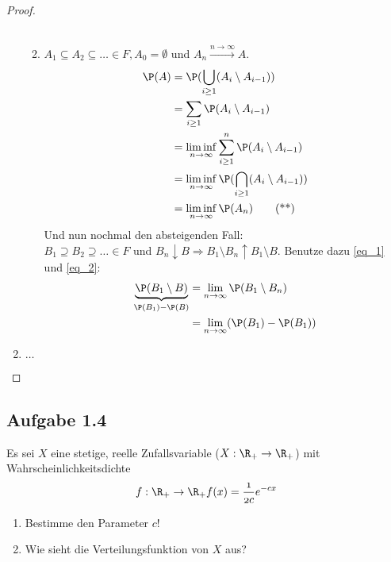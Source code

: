 \begin{proof}
\begin{enumerate}
\begin{enumerate}
\begin{align}
			\end{align}
			\item $A_1 \subseteq A_2 \subseteq \dots \in F, A_0 = \emptyset$ und $A_n \xrightarrow{n \to \infty} A$. 
			\begin{align}
				\P(A) 
				&= \P(\bigcup_{i \ge 1} (A_i \setminus A_{i-1})) \notag\\
				&= \sum_{i\ge 1} \P(A_i \setminus A_{i-1})\notag\\
				&= \liminf_{n \to \infty} \sum_{i\ge 1}^{n} \P(A_i \setminus A_{i-1})\notag \\
				&= \liminf_{n \to \infty} \P(\bigcap_{i \ge 1} (A_i\setminus A_{i-1})) \notag\\
				&= \liminf_{n \to \infty} \P(A_n)
				\label{eq_2}\tag{**}
			\end{align}
			Und nun nochmal den absteigenden Fall:\\
			$B_1 \supseteq B_2 \supseteq \dots \in F$ und $B_n \downarrow B \Longrightarrow B_1 \setminus B_n \uparrow B_1 \setminus B$. Benutze dazu \cref{eq_1} und \cref{eq_2}:
			\begin{align}
				\underbrace{\P(B_1 \setminus B)}_{\P(B_1) - \P(B)} &= \lim_{n \to \infty} \P(B_1 \setminus B_n) \notag\\
				&= \lim_{n \to \infty} (\P(B_1) - \P(B_1))\notag
			\end{align}
		\end{enumerate}
	\item $\dots$ %
	\end{enumerate}
\end{proof}


\subsection{Aufgabe 1.4}
Es sei $X$ eine stetige, reelle Zufallsvariable ($X: \R_{+} \to \R_{+}$) mit Wahrscheinlichkeitsdichte
\begin{align*}
	f: \R_{+} \to \R_{+} \mit f(x) = \frac{1}{2c} e^{-cx}
\end{align*}

\begin{enumerate}[label=\alph*)]
	\item Bestimme den Parameter $c$!
	\item Wie sieht die Verteilungsfunktion von $X$ aus?
\end{enumerate}

